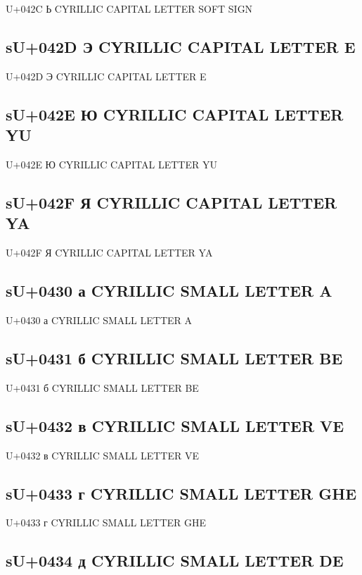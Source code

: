 U+042C Ь  CYRILLIC CAPITAL LETTER SOFT SIGN

\subsection{sU+042D Э  CYRILLIC CAPITAL LETTER E}

U+042D Э  CYRILLIC CAPITAL LETTER E

\subsection{sU+042E Ю  CYRILLIC CAPITAL LETTER YU}

U+042E Ю  CYRILLIC CAPITAL LETTER YU

\subsection{sU+042F Я  CYRILLIC CAPITAL LETTER YA}

U+042F Я  CYRILLIC CAPITAL LETTER YA

\subsection{sU+0430 а  CYRILLIC SMALL LETTER A}

U+0430 а  CYRILLIC SMALL LETTER A

\subsection{sU+0431 б  CYRILLIC SMALL LETTER BE}

U+0431 б  CYRILLIC SMALL LETTER BE

\subsection{sU+0432 в  CYRILLIC SMALL LETTER VE}

U+0432 в  CYRILLIC SMALL LETTER VE

\subsection{sU+0433 г  CYRILLIC SMALL LETTER GHE}

U+0433 г  CYRILLIC SMALL LETTER GHE

\subsection{sU+0434 д  CYRILLIC SMALL LETTER DE}

